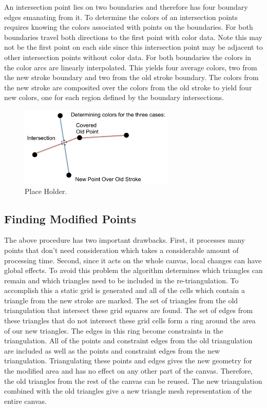 \documentclass[review]{acmsiggraph}
\begin{document}
An intersection point lies on two boundaries and therefore has four boundary edges emanating from it. 
To determine the colors of an intersection points requires knowing the colors associated with
points on the boundaries. For both boundaries travel both directions to the first point with color data. Note this may not
be the first point on each side since this intersection point may be adjacent to other intersection
points without color data. For both boundaries the colors in the color arcs are linearly interpolated. 
This yields four average colors, two from the new stroke boundary and two from the old stroke boundary.
The colors from the new stroke are composited over the colors from the old stroke to yield four new
colors, one for each region defined by the boundary intersections. 

\begin{figure}
    \centering
        \includegraphics[height=1.5in]{images/determiningcolors}
    \caption{Place Holder.}
\end{figure}


\subsection{Finding Modified Points}
The above procedure has two important drawbacks. First, it processes many points that don't need
consideration which takes a considerable amount of processing time. Second, since it acts on the whole
canvas, local changes can have global effects. To avoid this problem the algorithm determines
which triangles can remain
and which triangles need to be included in the re-triangulation. To accomplish this a static grid
is generated and all of the cells which contain a triangle from the new stroke are marked. 
The set of triangles from the old triangulation that intersect these grid squares are found.
The set of edges from these triangles that do not intersect these grid cells form a ring
around the area of our new triangles. The edges in this ring become constraints
in the triangulation. All of the points and constraint edges from the old triangulation are
included as well as the points and constraint edges from the new triangulation. Triangulating
these points and edges gives the new geometry for the modified area and has no effect on any
other part of the canvas. Therefore, the old triangles from the rest of the canvas can be reused. 
The new triangulation combined with the old triangles give a new triangle mesh representation of the entire canvas.
\end{document}
